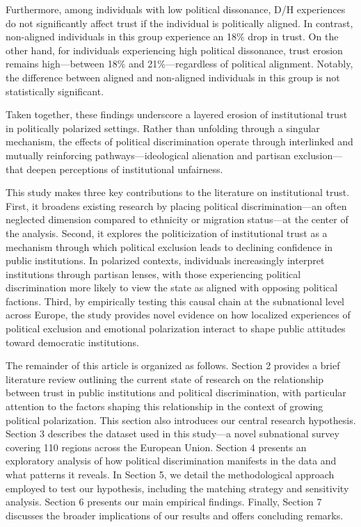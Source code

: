 \documentclass{article}
\begin{document}
Furthermore, among individuals with low political dissonance, D/H experiences do not significantly affect trust if the individual is politically aligned. In contrast, non-aligned individuals in this group experience an 18\% drop in trust. On the other hand, for individuals experiencing high political dissonance, trust erosion remains high—between 18\% and 21\%—regardless of political alignment. Notably, the difference between aligned and non-aligned individuals in this group is not statistically significant.

Taken together, these findings underscore a layered erosion of institutional trust in politically polarized settings. Rather than unfolding through a singular mechanism, the effects of political discrimination operate through interlinked and mutually reinforcing pathways—ideological alienation and partisan exclusion—that deepen perceptions of institutional unfairness.

This study makes three key contributions to the literature on institutional trust. First, it broadens existing research by placing political discrimination—an often neglected dimension compared to ethnicity or migration status—at the center of the analysis. Second, it explores the politicization of institutional trust as a mechanism through which political exclusion leads to declining confidence in public institutions. In polarized contexts, individuals increasingly interpret institutions through partisan lenses, with those experiencing political discrimination more likely to view the state as aligned with opposing political factions. Third, by empirically testing this causal chain at the subnational level across Europe, the study provides novel evidence on how localized experiences of political exclusion and emotional polarization interact to shape public attitudes toward democratic institutions.

The remainder of this article is organized as follows. Section 2 provides a brief literature review outlining the current state of research on the relationship between trust in public institutions and political discrimination, with particular attention to the factors shaping this relationship in the context of growing political polarization. This section also introduces our central research hypothesis. Section 3 describes the dataset used in this study—a novel subnational survey covering 110 regions across the European Union. Section 4 presents an exploratory analysis of how political discrimination manifests in the data and what patterns it reveals. In Section 5, we detail the methodological approach employed to test our hypothesis, including the matching strategy and sensitivity analysis. Section 6 presents our main empirical findings. Finally, Section 7 discusses the broader implications of our results and offers concluding remarks.
\end{document}
